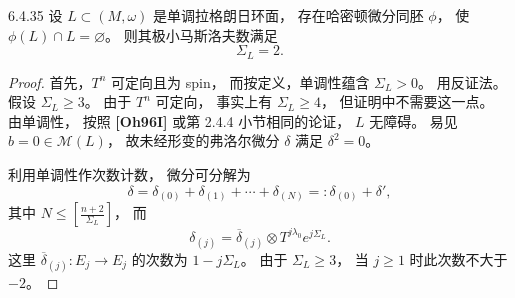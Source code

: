 \begin{theorem}{6.4.35}\label{thm:6-4-35}
设 $L\subset(M,\omega)$
是单调拉格朗日环面，
存在哈密顿微分同胚 $\phi$，
使 $\phi(L)\cap L=\varnothing$。
则其极小马斯洛夫数满足
\[
\Sigma_L=2.
\]
\end{theorem}

\begin{proof}
首先，$T^n$ 可定向且为 spin，
而按定义，单调性蕴含 $\Sigma_L>0$。
用反证法。
假设 $\Sigma_L\ge3$。
由于 $T^n$ 可定向，
事实上有 $\Sigma_L\ge4$，
但证明中不需要这一点。
由单调性，
按照 \textbf{[Oh96I]}
或第 2.4.4 小节相同的论证，
$L$ 无障碍。
易见 $b=0\in\mathcal M(L)$，
故未经形变的弗洛尔微分 $\delta$
满足 $\delta^2=0$。

利用单调性作次数计数，
微分可分解为
\[
\delta
=\delta_{(0)}+\delta_{(1)}
+\cdots+\delta_{(N)}
=:\delta_{(0)}+\delta',
\]
其中
$N\le\left[\frac{n+2}{\Sigma_L}\right]$，
而
\begin{equation}
\delta_{(j)}
=\overline\delta_{(j)}
\otimes T^{j\lambda_0}e^{j\Sigma_L}.
\tag{6.4.36}\label{eq:6-4-36}
\end{equation}
这里 $\overline\delta_{(j)}:E_j\to E_j$
的次数为 $1-j\Sigma_L$。
由于 $\Sigma_L\ge3$，
当 $j\ge1$ 时此次数不大于 $-2$。


\end{proof}

